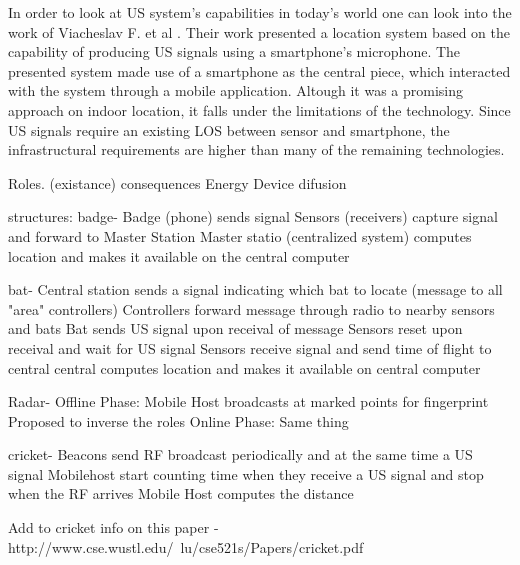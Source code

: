 	In order to look at \ac{US} system's capabilities in today's world one can look into the work of Viacheslav F. et al \cite{us_ex}. Their work presented a location system based on the capability of producing \ac{US} signals using a smartphone's microphone. The presented system made use of a smartphone as the central piece, which interacted with the system through a mobile application. Altough it was a promising approach on indoor location, it falls under the limitations of the technology. Since \ac{US} signals require an existing \ac{LOS} between sensor and smartphone, the infrastructural requirements are higher than many of the remaining technologies.























Roles. (existance) consequences
Energy
Device difusion

structures:
badge-      Badge (phone) sends signal
			Sensors (receivers) capture signal and forward to Master Station
			Master statio (centralized system) computes location and makes it available on the central computer




bat- 		Central station sends a signal indicating which bat to locate (message to all "area" controllers)
			Controllers forward message through radio to nearby sensors and bats
			Bat sends US signal upon receival of message
			Sensors reset upon receival and wait for US signal
			Sensors receive signal and send time of flight to central
			central computes location and makes it available on central computer



Radar-		Offline Phase:
				Mobile Host broadcasts at marked points for fingerprint
				Proposed to inverse the roles
			Online Phase:
				Same thing




cricket- 	Beacons send RF broadcast periodically and at the same time a US signal
			Mobilehost start counting time when they receive a US signal and stop when the RF arrives
			Mobile Host computes the distance

Add to cricket info on this paper - http://www.cse.wustl.edu/~lu/cse521s/Papers/cricket.pdf





